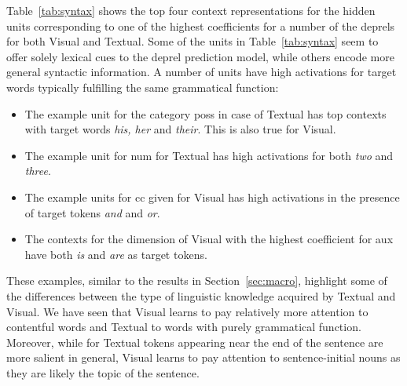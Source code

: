 Table~\ref{tab:syntax} shows the top four context representations for the hidden units 
corresponding to one of the highest coefficients for a number of the deprels for both 
{\sc Visual} and {\sc Textual}. Some of the units in Table~\ref{tab:syntax} seem to offer 
solely lexical cues to the deprel prediction model, while others encode more general 
syntactic information. A number of units have high activations for target words typically 
fulfilling the same grammatical function:
\begin{itemize}
    \item The example unit for the category {\sc poss} in case of {\sc Textual} has top contexts with target words {\it his, her} and {\it their}. This is also true for {\sc Visual}.
    \item The example unit for {\sc num} for {\sc Textual} has high activations for both {\it two} and {\it three}.
    \item The example units for {\sc cc} given for {\sc Visual} has high activations in the presence of target tokens {\it and} and {\it or}.
    \item The contexts for the dimension of {\sc Visual} with the highest coefficient for {\sc aux} have both {\it is} and {\it are} as target tokens.
\end{itemize}

\noindent These examples, similar to the results in Section~\ref{sec:macro}, 
highlight some of the differences between the type of linguistic 
knowledge acquired by {\sc Textual} and {\sc Visual}. We have
seen that {\sc Visual} learns to pay relatively more attention to contentful words
and {\sc Textual} to words with purely grammatical function. Moreover,
while for {\sc Textual} tokens appearing near the end of the sentence
are more salient in general, {\sc Visual} learns to pay attention to
sentence-initial nouns as they are likely the {\sc topic} of the sentence. 

